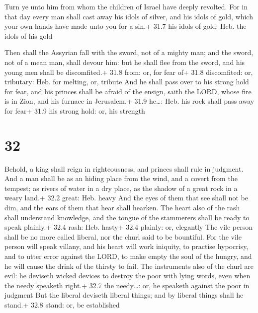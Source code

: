  Turn ye unto him from whom the children of Israel have
deeply revolted.  For in that day every man shall cast away
his idols of silver, and his idols of gold, which your own hands have
made unto you for a sin.+ 31.7 his idols of gold: Heb. the idols of his
gold

 Then shall the Assyrian fall with the sword, not of a
mighty man; and the sword, not of a mean man, shall devour him: but he
shall flee from the sword, and his young men shall be discomfited.+ 31.8
from: or, for fear of+ 31.8 discomfited: or, tributary: Heb. for
melting, or, tribute  And he shall pass over to his strong
hold for fear, and his princes shall be afraid of the ensign, saith the
LORD, whose fire is in Zion, and his furnace in Jerusalem.+ 31.9
he\ldots: Heb. his rock shall pass away for fear+ 31.9 his strong hold:
or, his strength

\hypertarget{section-31}{%
\section{32}\label{section-31}}

 Behold, a king shall reign in righteousness, and princes
shall rule in judgment.  And a man shall be as an hiding
place from the wind, and a covert from the tempest; as rivers of water
in a dry place, as the shadow of a great rock in a weary land.+ 32.2
great: Heb. heavy  And the eyes of them that see shall not
be dim, and the ears of them that hear shall hearken.  The
heart also of the rash shall understand knowledge, and the tongue of the
stammerers shall be ready to speak plainly.+ 32.4 rash: Heb. hasty+ 32.4
plainly: or, elegantly  The vile person shall be no more
called liberal, nor the churl said to be bountiful.  For the
vile person will speak villany, and his heart will work iniquity, to
practise hypocrisy, and to utter error against the LORD, to make empty
the soul of the hungry, and he will cause the drink of the thirsty to
fail.  The instruments also of the churl are evil: he
deviseth wicked devices to destroy the poor with lying words, even when
the needy speaketh right.+ 32.7 the needy\ldots: or, he speaketh against
the poor in judgment  But the liberal deviseth liberal
things; and by liberal things shall he stand.+ 32.8 stand: or, be
established

